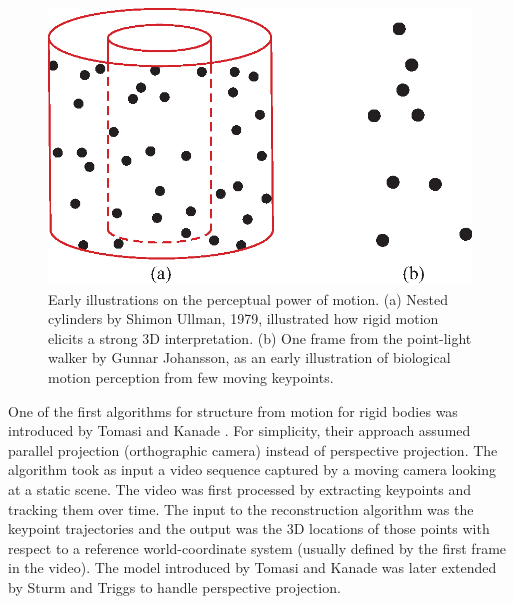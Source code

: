 
\begin{figure}
\centerline{
\includegraphics[width=.7\linewidth]{figures/sfm/demos_motivation.eps}
} 
\caption{Early illustrations on the perceptual power of motion. (a) Nested cylinders by Shimon Ullman, 1979, illustrated how rigid motion elicits a strong 3D interpretation. (b) One frame from the point-light walker by Gunnar Johansson, as an early illustration of biological motion perception from few moving keypoints.}
\label{fig:demos_motivation_sfm}
\end{figure}


One of the first algorithms for structure from motion for rigid bodies was introduced by Tomasi and Kanade \cite{Tomasi92}. For simplicity, their approach assumed parallel projection (orthographic camera) instead of perspective projection. The algorithm took as input a video sequence captured by a moving camera looking at a static scene. The video was first processed by extracting keypoints and tracking them over time. The input to the reconstruction algorithm was the keypoint trajectories and the output was the 3D locations of those points with respect to a reference world-coordinate system (usually defined by the first frame in the video). 
 The model introduced by Tomasi and Kanade was later extended by Sturm and Triggs \cite{Sturm1996} to handle perspective projection.

